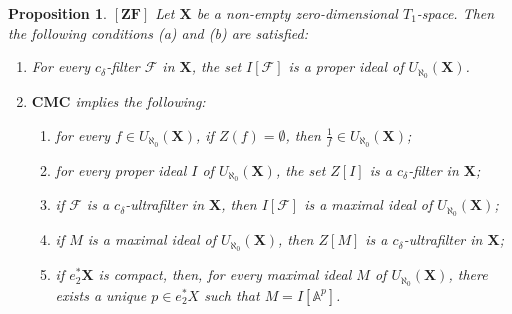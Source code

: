 \documentclass[12pt,twoside,leqno]{article}
\theoremstyle{plain}
\newtheorem{proposition}[theorem]{Proposition}
\theoremstyle{definition}
\theoremstyle{remark}
\begin{document}
\begin{proposition}
	\label{s2:p21}
	$[{\mathbf{ZF}}]$ Let $\mathbf{X}$ be a non-empty zero-dimensional $T_1$-space. Then the following conditions (a) and (b) are satisfied:
	\begin{enumerate}
		\item[(a)] For every $c_{\delta}$-filter $\mathcal{F}$ in $\mathbf{X}$, the set $I[\mathcal{F}]$ is a proper ideal of $U_{\aleph_0}(\mathbf{X})$.
		\item[(b)] $\mathbf{CMC}$ implies the following:
		\begin{enumerate}
			\item[(i)] for every $f\in U_{\aleph_0}(\mathbf{X})$, if $Z(f)=\emptyset$, then $\frac{1}{f}\in U_{\aleph_0}(\mathbf{X})$;
			\item[(ii)] for every proper ideal $I$ of $U_{\aleph_0}(\mathbf{X})$, the set $Z[I]$ is a $c_{\delta}$-filter in $\mathbf{X}$; 
			\item[(iii)] if $\mathcal{F}$ is a $c_{\delta}$-ultrafilter in $\mathbf{X}$, then $I[\mathcal{F}]$ is a maximal ideal of $U_{\aleph_0}(\mathbf{X})$;
			\item[(iv)] if  $M$ is a maximal ideal of $U_{\aleph_0}(\mathbf{X})$, then $Z[M]$ is a $c_{\delta}$-ultrafilter in $\mathbf{X}$;
			\item[(v)] if $e_{2}^{\ast}\mathbf{X}$ is compact, then, for every maximal ideal $M$ of $U_{\aleph_0}(\mathbf{X})$, there exists a unique $p\in e_{2}^{\ast}X$ such that $M=I[\mathbb{A}^p]$.
		\end{enumerate}
	\end{enumerate}
\end{proposition}
\end{document}
